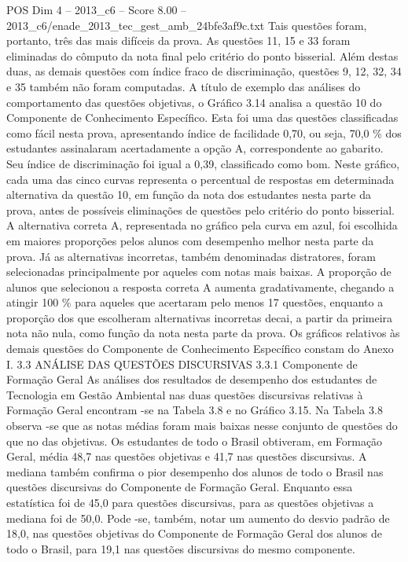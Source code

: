 \begin{textsample}{POS Dim 4 – 2013\_c6 – Score 8.00 – 2013\_c6/enade\_2013\_tec\_gest\_amb\_24bfe3af9c.txt}
Tais questões foram, portanto, três das mais difíceis da prova.
As questões 11, 15 e 33 foram eliminadas do cômputo da nota final pelo critério do ponto bisserial.
Além destas duas, as demais questões com índice fraco de discriminação, questões 9, 12, 32, 34 e 35 também não foram computadas.
A título de exemplo das análises do comportamento das questões objetivas, o Gráfico 3.14 analisa a questão 10 do Componente de Conhecimento Específico.
Esta foi uma das questões classificadas como fácil nesta prova, apresentando índice de facilidade 0,70, ou seja, 70,0 \% dos estudantes assinalaram acertadamente a opção A, correspondente ao gabarito.
Seu índice de discriminação foi igual a 0,39, classificado como bom.
Neste gráfico, cada uma das cinco curvas representa o percentual de respostas em determinada alternativa da questão 10, em função da nota dos estudantes nesta parte da prova, antes de possíveis eliminações de questões pelo critério do ponto bisserial.
A alternativa correta A, representada no gráfico pela curva em azul, foi escolhida em maiores proporções pelos alunos com desempenho melhor nesta parte da prova.
Já as alternativas incorretas, também denominadas distratores, foram selecionadas principalmente por aqueles com notas mais baixas.
A proporção de alunos que selecionou a resposta correta A aumenta gradativamente, chegando a atingir 100 \% para aqueles que acertaram pelo menos 17 questões, enquanto a proporção dos que escolheram alternativas incorretas decai, a partir da primeira nota não nula, como função da nota nesta parte da prova.
Os gráficos relativos às demais questões do Componente de Conhecimento Específico constam do Anexo I. 3.3 ANÁLISE DAS QUESTÕES DISCURSIVAS 3.3.1 Componente de Formação Geral As análises dos resultados de desempenho dos estudantes de Tecnologia em Gestão Ambiental nas duas questões discursivas relativas à Formação Geral encontram -se na Tabela 3.8 e no Gráfico 3.15.
Na Tabela 3.8 observa -se que as notas médias foram mais baixas nesse conjunto de questões do que no das objetivas.
Os estudantes de todo o Brasil obtiveram, em Formação Geral, média 48,7 nas questões objetivas e 41,7 nas questões discursivas.
A mediana também confirma o pior desempenho dos alunos de todo o Brasil nas questões discursivas do Componente de Formação Geral.
Enquanto essa estatística foi de 45,0 para questões discursivas, para as questões objetivas a mediana foi de 50,0.
Pode -se, também, notar um aumento do desvio padrão de 18,0, nas questões objetivas do Componente de Formação Geral dos alunos de todo o Brasil, para 19,1 nas questões discursivas do mesmo componente.

\end{textsample}
